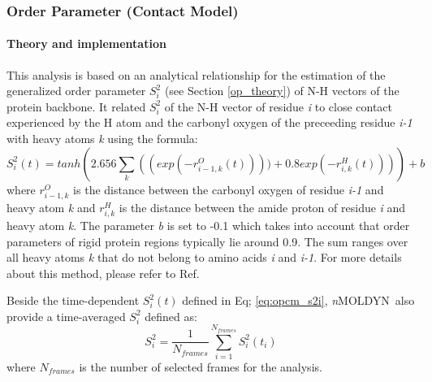 \documentclass[a4paper,11pt]{report}
\newcommand{\NMOLDYN}{\textit{n}MOLDYN}
\begin{document}
\subsubsection{Order Parameter (Contact Model)}
\label{opcm}
\paragraph{Theory and implementation\\}
\label{opcm_theory}
This analysis is based on an analytical relationship for the estimation of the generalized order parameter $S^2_i$ 
(see Section \ref{op_theory}) of N-H vectors of the protein backbone. It related $S^2_i$ of the N-H vector of residue 
\textit{i} to close contact experienced by the H atom and the carbonyl oxygen of the preceeding residue \textit{i-1} 
with heavy atoms \textit{k} using the formula:
\begin{equation}
\label{eq:opcm_s2i}
S^2_i(t) = tanh\left(2.656\sum_k \left((exp(-r^O_{i-1,k}(t)))) + 0.8exp(-r^H_{i,k}(t))\right)\right) + b
\end{equation}
where $r^O_{i-1,k}$ is the distance between the carbonyl oxygen of residue \textit{i-1} and heavy atom \textit{k} and $r^H_{i,k}$ is 
the distance between the amide proton of residue \textit{i} and heavy atom \textit{k}. The parameter \textit{b} is set to -0.1 which takes into account that order 
parameters of rigid protein regions typically lie around 0.9. The sum ranges over all heavy atoms \textit{k} that do not belong to amino 
acids \textit{i} and \textit{i-1}. For more details about this method, please refer to Ref. \cite{Bruschweiler}

Beside the time-dependent $S^2_i(t)$ defined in Eq; \ref{eq:opcm_s2i}, \NMOLDYN\ also provide a time-averaged $S^2_i$ defined as:
\begin{equation}
\label{eq:opcm_s2i_avg}
S^2_i = \frac{1}{N_{frames}}\sum_{i=1}^{N_{frames}} S^2_i(t_i)
\end{equation}
where $N_{frames}$ is the number of selected frames for the analysis.
\end{document}
